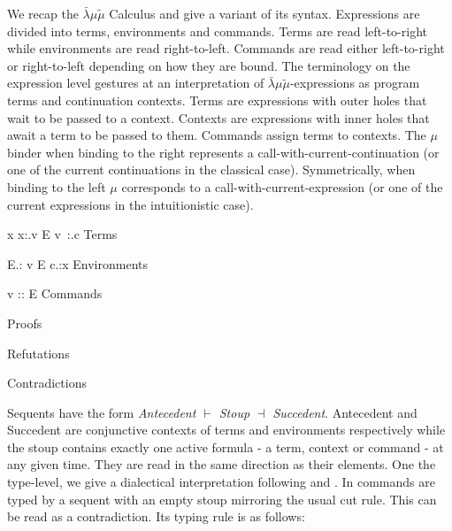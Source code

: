 \documentclass{ecai}
\newcommand{\matilda}{\bar{\lambda}\mu \tilde{\mu}}
\begin{document}
We recap the $\matilda$ Calculus and give a variant of its syntax.
Expressions are divided into terms, environments and commands.
Terms are read left-to-right while environments are read right-to-left.
Commands are read either left-to-right or right-to-left depending on how they are bound.
The terminology on the expression level gestures at an interpretation of $\matilda$-expressions as program terms and continuation contexts.
Terms are expressions with outer holes that wait to be passed to a context.
Contexts are expressions with inner holes that await a term to be passed to them.
Commands assign terms to contexts.
The $\mu$ binder when binding to the right represents a call-with-current-continuation (or one of the current continuations in the classical case).
Symmetrically, when binding to the left $\mu$ corresponds to a call-with-current-expression (or one of the current expressions in the intuitionistic case).

  \begin{grammar}[Grammar of the $\matilda$-calculus][][gram:terms]
      {x
       \gralt \lambda x:\pro{\sigma}.v
       \gralt E \circ v\
       \gralt \mu \alpha:.c
      }
      {Terms}

      {\alpha
       \gralt E.:\alpha\lambda
       \gralt v \circ E
       \gralt c.\pro{\sigma}:x \mu
      }
      {Environments}

     
      {\rangle v :\contr{\sigma}:  E \langle
      }
      {Commands}
  

    \firstcasesubtil{\pro{\sigma,\delta}}
      {
       \gralt \pro{\sigma \rightarrow  \delta  }
       \gralt \pro{ \sigma - \delta  }
      }
      {Proofs}

      {
       \gralt {}
       \gralt {}
      }
      {Refutations}

    \firstcasesubtil{\contr{\sigma}, \contr{\delta}}
      {
       \gralt \contr{\sigma \rightarrow \delta}
       \gralt \contr{\sigma - \delta}
      }
      {Contradictions}
  \end{grammar}

Sequents have the form \emph{Antecedent $\vdash$ Stoup $\dashv$ Succedent}.
Antecedent and Succedent are conjunctive contexts of terms and environments respectively while the stoup contains exactly one active formula - a term, context or command - at any given time.
They are read in the same direction as their elements.
One the type-level, we give a dialectical interpretation following \cite{lovas-struc-normal} and \cite{} .
In \cite{herbelin-2000} commands are typed by a sequent with an empty stoup mirroring the usual cut rule.
This can be read as a contradiction.
Its typing rule is as follows:
\end{document}
